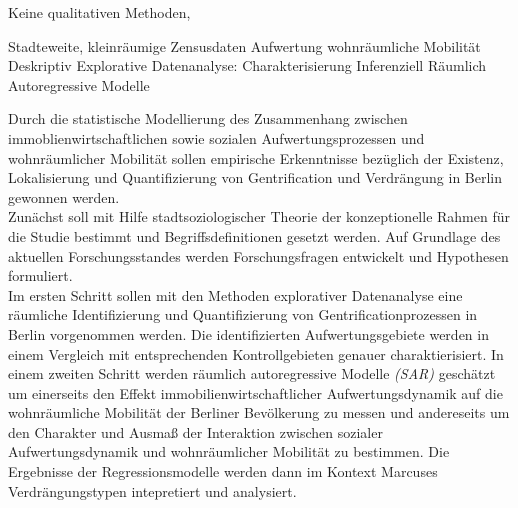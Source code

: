\begin{itemize}
Keine qualitativen Methoden, 

Stadteweite, kleinräumige Zensusdaten Aufwertung wohnräumliche Mobilität
Deskriptiv Explorative Datenanalyse: Charakterisierung  
Inferenziell Räumlich Autoregressive Modelle

Durch die statistische Modellierung des Zusammenhang zwischen immoblienwirtschaftlichen sowie sozialen Aufwertungsprozessen und wohnräumlicher Mobilität sollen empirische Erkenntnisse bezüglich der Existenz, Lokalisierung und Quantifizierung von Gentrification und Verdrängung in Berlin gewonnen werden. \\
Zunächst soll mit Hilfe stadtsoziologischer Theorie der konzeptionelle Rahmen für die Studie bestimmt und Begriffsdefinitionen gesetzt werden. Auf Grundlage des aktuellen Forschungsstandes werden Forschungsfragen entwickelt und Hypothesen formuliert. \\
Im ersten Schritt sollen mit den Methoden explorativer Datenanalyse eine räumliche Identifizierung und Quantifizierung von Gentrificationprozessen in Berlin vorgenommen werden. Die identifizierten Aufwertungsgebiete werden in einem Vergleich mit entsprechenden Kontrollgebieten genauer charaktierisiert. In einem zweiten Schritt werden räumlich autoregressive Modelle \textit{(\ac{SAR})} geschätzt um einerseits den Effekt immobilienwirtschaftlicher Aufwertungsdynamik auf die wohnräumliche Mobilität der Berliner Bevölkerung zu messen und andereseits um den Charakter und Ausmaß der Interaktion zwischen sozialer Aufwertungsdynamik und wohnräumlicher Mobilität zu bestimmen. Die Ergebnisse der Regressionsmodelle werden dann im Kontext Marcuses Verdrängungstypen intepretiert und analysiert.
\end{itemize}
